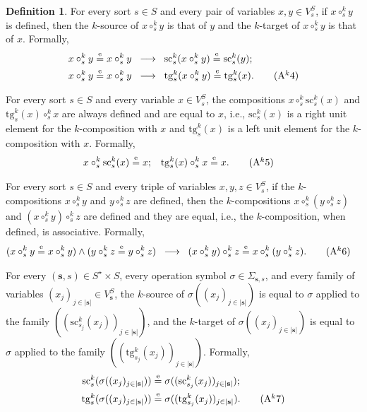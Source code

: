 \documentclass[a4paper, reqno
]{amsart}
\newcommand{\eeq}{\overset{\mathrm e}{=}}      %
\newcommand{\src}{\mathrm{sc}}
\newcommand{\tgt}{\mathrm{tg}}
\theoremstyle{plain}
\theoremstyle{definition}
\newtheorem{definition}[theorem]{Definition}
\begin{document}
\begin{definition}
For every sort $s\in S$ and every pair of variables $x,y\in V^{S}_{s}$, if $x\circ^{k}_{s} y$ is defined, then the $k$-source of $x\circ^{k}_{s}y$ is that of $y$ and the $k$-target of $x\circ^{k}_{s}y$ is that of $x$.
Formally,
\begin{align*}
x\circ^{k}_{s}y\eeq x\circ^{k}_{s}y \;\;
&\longrightarrow \;\;
\src^{k}_{s}(x\circ^{k}_{s}y)\eeq\src^{k}_{s}(y);\\
x\circ^{k}_{s}y\eeq x\circ^{k}_{s}y \;\;
&\longrightarrow \;\;
\tgt^{k}_{s}(x\circ^{k}_{s}y)\eeq\tgt^{k}_{s}(x).\label{ASingleSetAk4}\tag{A$^{k}$4}
\end{align*}

For every sort $s\in S$ and every variable $x\in V^{S}_{s}$, the compositions $x\circ^{k}_{s}\src^{k}_{s}(x)$ and $\tgt^{k}_{s}(x)\circ^{k}_{s}x$ are always defined and are equal to $x$, i.e., $\src^{k}_{s}(x)$ is a right unit element for the $k$-composition with $x$ and $\tgt^{k}_{s}(x)$ is a left unit element for the $k$-composition with $x$.
Formally,
\begin{align*}
x\circ^{k}_{s}\src^{k}_{s}(x)&\eeq x;
&
\tgt^{k}_{s}(x)\circ^{k}_{s}x&\eeq x.\label{ASingleSetAk5}\tag{A$^{k}$5}
\end{align*}

For every sort $s\in S$ and every triple of variables $x, y, z\in V^{S}_{s}$, if the $k$-compositions $x\circ^{k}_{s}y$ and $y\circ^{k}_{s}z$ are defined, then the $k$-compositions $x\circ^{k}_{s}(y\circ^{k}_{s}z)$ and $(x\circ^{k}_{s}y)\circ^{k}_{s}z$ are defined and they are equal, i.e., the $k$-composition, when defined, is associative.
Formally,
\begin{align*}
(x\circ^{k}_{s}y\eeq x\circ^{k}_{s}y)
\wedge
(y\circ^{k}_{s}z\eeq y\circ^{k}_{s}z)\;\;
&\longrightarrow \;\;
(x\circ^{k}_{s}y)\circ^{k}_{s}z\eeq x\circ^{k}_{s}(y\circ^{k}_{s}z).\label{ASingleSetAk6}\tag{A$^{k}$6}
\end{align*}

For every $(\mathbf{s},s)\in S^{\star}\times S$, every operation symbol $\sigma\in \Sigma_{\mathbf{s},s}$, and every family of variables $(x_{j})_{j\in \lvert\mathbf{s}\rvert}\in V^{S}_{\mathbf{s}}$, the $k$-source of $\sigma((x_{j})_{j\in \lvert\mathbf{s}\rvert})$ is equal to $\sigma$ applied to the family $((\src^{k}_{s_{j}}(x_{j}))_{j\in \lvert\mathbf{s}\rvert})$, and the $k$-target of $\sigma((x_{j})_{j\in \lvert\mathbf{s}\rvert})$ is equal to $\sigma$ applied to the family $((\tgt^{k}_{s_{j}}(x_{j}))_{j\in \lvert\mathbf{s}\rvert})$.
Formally,
\begin{align*}
\src^{k}_{s}(\sigma((x_{j})_{j\in \lvert\mathbf{s}\rvert}))&\eeq\sigma((\src^{k}_{s_{j}}(x_{j}))_{j\in \lvert\mathbf{s}\rvert});\\
\tgt^{k}_{s}(\sigma((x_{j})_{j\in \lvert\mathbf{s}\rvert}))&\eeq\sigma((\tgt^{k}_{s_{j}}(x_{j}))_{j\in \lvert\mathbf{s}\rvert}).\label{ASingleSetAk7}\tag{A$^{k}$7}
\end{align*}


\end{definition}
\end{document}
